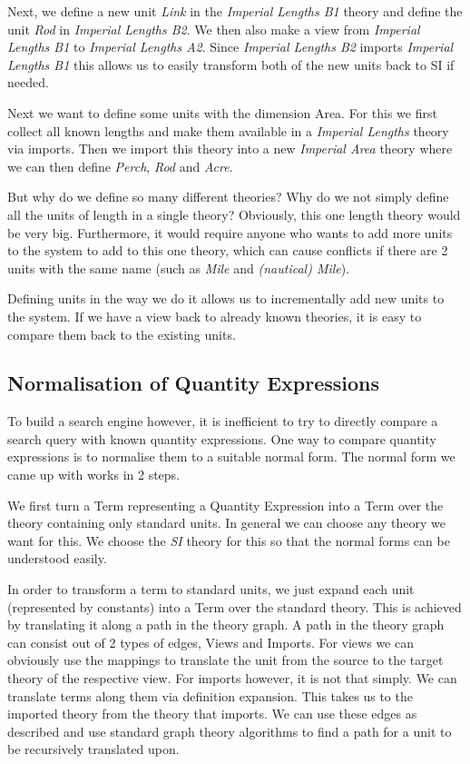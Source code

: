 Next, we define a new unit \textit{Link} in the \textit{Imperial Lengths B1} theory and define the unit \textit{Rod} in \textit{Imperial Lengths B2}. We then also make a view from \textit{Imperial Lengths B1} to \textit{Imperial Lengths A2}. Since \textit{Imperial Lengths B2} imports \textit{Imperial Lengths B1} this allows us to easily transform both of the new units back to SI if needed.

Next we want to define some units with the dimension Area. For this we first collect all known lengths and make them available in a \textit{Imperial Lengths} theory via imports. Then we import this theory into a new \textit{Imperial Area} theory where we can then define \textit{Perch}, \textit{Rod} and \textit{Acre}.

But why do we define so many different theories? Why do we not simply define all the units of length in a single theory? Obviously, this one length theory would be very big. Furthermore, it would require anyone who wants to add more units to the system to add to this one theory, which can cause conflicts if there are 2 units with the same name (such as \textit{Mile} and \textit{(nautical) Mile}).

Defining units in the way we do it allows us to incrementally add new units to the system. If we have a view back to already known theories, it is easy to compare them back to the existing units.

\subsection{Normalisation of Quantity Expressions}

To build a search engine however, it is inefficient to try to directly compare a search query with known quantity expressions. One way to compare quantity expressions is to normalise them to a suitable normal form. The normal form we came up with works in 2 steps.

We first turn a Term representing a Quantity Expression into a Term over the theory containing only standard units. In general we can choose any theory we want for this. We choose the \textit{SI} theory for this so that the normal forms can be understood easily.

In order to transform a term to standard units, we just expand each unit (represented by constants) into a Term over the standard theory. This is achieved by translating it along a path in the theory graph. A path in the theory graph can consist out of 2 types of edges, Views and Imports. For views we can obviously use the mappings to translate the unit from the source to the target theory of the respective view. For imports however, it is not that simply. We can translate terms along them via definition expansion. This takes us to the imported theory from the theory that imports. We can use these edges as described and use standard graph theory algorithms to find a path for a unit to be recursively translated upon.

